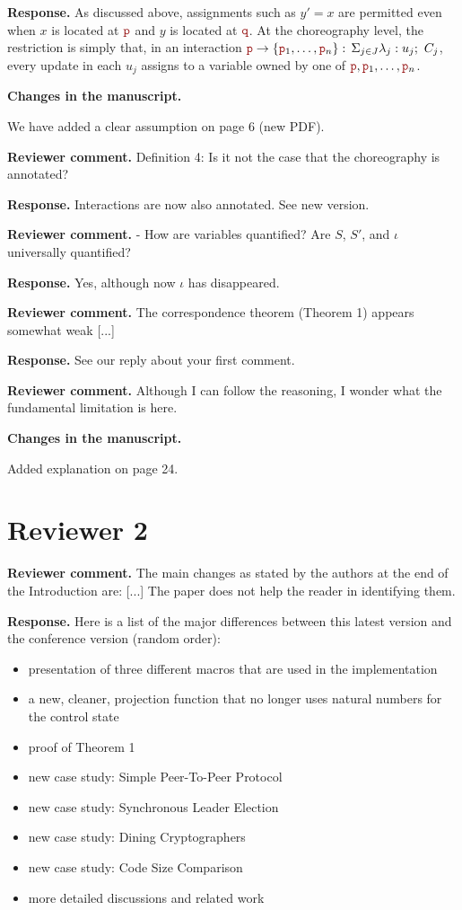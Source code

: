 \documentclass[11pt]{article}
\newcommand{\role}[1]{\textcolor{bloodyred}{\mathtt{#1}}}
\newcommand{\nr}{\role p}
\newcommand{\nrr}{\role q}
\newcommand{\interactBase}[2]{{#1}\rightarrow \{{#2}\}}
\newcommand{\interact}[2]{\interactBase{#1}{#2}:\,\Sigma_{j\in J}\lambda_j: u_j;\ C_j}
\newcommand{\revcomment}[1]{%
  \begin{reviewercomment}
  \textbf{Reviewer comment.} #1
  \end{reviewercomment}
}
\newcommand{\revresponse}[2][]{%
  \par\noindent\textbf{Response.} #1 #2
}
\newcommand{\revchanges}[2][]{%
  \par\noindent\textbf{Changes in the manuscript.} #1
  #2\par\bigskip
}
\begin{document}
\revresponse{
As discussed above, assignments such as $y' = x$ are permitted even when $x$ is located at $\nr$ and $y$ is located at $\nrr$. At the choreography level, the restriction is simply that, in an interaction $\interact{\nr}{\nr_1,\ldots,\nr_n}$, every update in each $u_j$ assigns to a variable owned by one of $\nr, \nr_1,\ldots,\nr_n$.
}
\revchanges{
We have added a clear assumption on page 6 (new PDF).
}

\revcomment{
Definition 4: Is it not the case that the choreography is annotated?
}

\revresponse{ Interactions are now also annotated. See new version.  }


\revcomment{
  - How are variables quantified? Are $S$, $S'$, and $\iota$ universally quantified?
}

\revresponse{
  Yes, although now $\iota$ has disappeared.
}

\revcomment{ The correspondence theorem (Theorem 1) appears somewhat
  weak [...]  }

\revresponse{ See our reply about your first comment.  }

\revcomment{
Although I can follow the reasoning, I wonder what the fundamental limitation is here.
}

\revchanges{
Added explanation on page 24.
}

\newpage

\section*{Reviewer 2}


\revcomment{
The main changes as stated by the authors at the end of the Introduction are:
[...] The paper does not help the reader in identifying them.
}

\revresponse{ Here is a list of the major differences between this
  latest version and the conference version (random order):
  \begin{itemize}
  \item presentation of three different macros that are used in the
    implementation
  \item a new, cleaner, projection function that no longer uses
    natural numbers for the control state
  \item proof of Theorem 1
  \item new case study: Simple Peer-To-Peer Protocol
  \item new case study: Synchronous Leader Election
  \item new case study: Dining Cryptographers
  \item new case study: Code Size Comparison
  \item more detailed discussions and related work
  \end{itemize}
}
\end{document}
